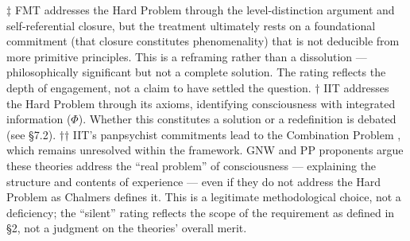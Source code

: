 \documentclass[12pt]{article}
\newcommand{\revstart}{}
\newcommand{\revend}{}
\begin{document}
\begin{table}[H]
\end{table}


{\revstart $\ddagger$ FMT addresses the Hard Problem through the level-distinction argument and self-referential closure, but the treatment ultimately rests on a foundational commitment (that closure constitutes phenomenality) that is not deducible from more primitive principles. This is a reframing rather than a dissolution --- philosophically significant but not a complete solution. The rating reflects the depth of engagement, not a claim to have settled the question.\revend}
$\dagger$ IIT addresses the Hard Problem through its axioms, identifying consciousness with integrated information ($\Phi$). Whether this constitutes a solution or a redefinition is debated (see \S7.2).
$\dagger$$\dagger$ IIT's panpsychist commitments lead to the Combination Problem \citep{Chalmers2016}, which remains unresolved within the framework.
\* GNW and PP proponents argue these theories address the ``real problem'' of consciousness \citep{Seth2021} --- explaining the structure and contents of experience --- even if they do not address the Hard Problem as Chalmers defines it. This is a legitimate methodological choice, not a deficiency; the ``silent'' rating reflects the scope of the requirement as defined in \S2, not a judgment on the theories' overall merit.
\end{document}
